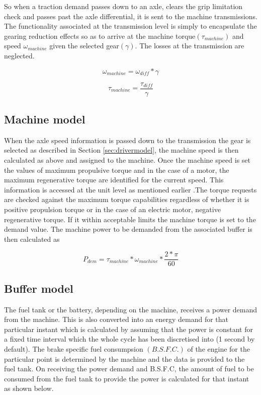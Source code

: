 \documentclass[MastersThesis.tex]{subfiles}
\begin{document}
 So when a traction demand passes down to an axle, clears the grip limitation check and passes past the axle differential, it is sent to the machine transmissions. The functionality associated at the transmission level is simply to encapsulate the gearing reduction effects so as to arrive at the machine torque$(\tau_{machine})$ and speed $\omega_{machine}$ given the selected gear$(\gamma)$. The losses at the transmission are neglected. 

\begin{equation} \label{eq:transpeedgearing}
\omega_{machine} =\omega_{diff}*\gamma
\end{equation}

\begin{equation} \label{eq:transtorquegearing}
\tau_{machine} =\frac{ \tau_{diff}}{\gamma}
\end{equation}

\subsection{Machine model}
\label{sec:machinemodel}

When the axle speed information is passed down to the transmission the gear is selected as described in Section \ref{sec:drivermodel}, the machine speed is then calculated as above and assigned to the machine. Once the machine speed is set the values of maximum propulsive torque and in the case of a motor, the maximum regenerative torque are identified for the current speed. This information is accessed at the unit level as mentioned earlier .The torque requests are checked against the maximum torque capabilities regardless of whether it is positive propulsion torque or in the case of an electric motor, negative regenerative torque. If it within acceptable limits the machine torque is set to the demand value. The machine power to be demanded from the associated buffer is then calculated as 

\begin{equation} \label{eq:machinepowerdem}
P_{dem}=\tau_{machine}*\omega_{machine}*\frac{2*\pi}{60}
\end{equation}

\subsection{Buffer model}
\label{sec:machinemodel}

The fuel tank or the battery, depending on the machine, receives a power demand from the machine. This is also converted into an energy demand for that particular instant which is calculated by assuming that the power is constant for a fixed time interval which the whole cycle has been discretised into (1 second by default). The brake specific fuel consumpsion $(B.S.F.C.)$ of the engine for the particular point is determined by the machine and the data is provided to the fuel tank.  On receiving the power demand and B.S.F.C, the amount of fuel to be consumed from the fuel tank to provide the power is calculated for that instant as shown below.
\end{document}
